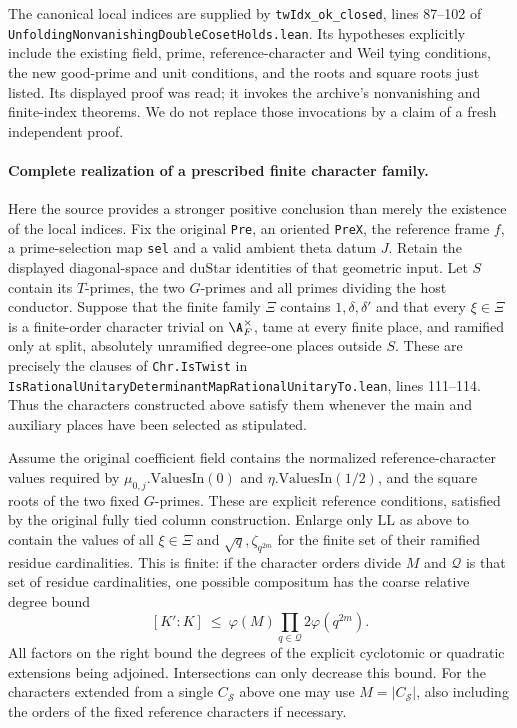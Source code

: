 \documentclass[11pt]{article}
\theoremstyle{definition}\newtheorem{definition}[theorem]{Definition}\newtheorem{remark}[theorem]{Remark}
\begin{document}
The canonical local indices are supplied by
\texttt{twIdx\_ok\_closed}, lines 87--102 of
\nolinkurl{UnfoldingNonvanishingDoubleCosetHolds.lean}.
Its hypotheses explicitly include the existing field,
prime, reference-character and Weil tying conditions,
the new good-prime and unit conditions, and the roots
and square roots just listed.  Its displayed proof was
read; it invokes the archive's nonvanishing and finite-index
theorems.  We do not replace those invocations by a claim
of a fresh independent proof.

\paragraph{Complete realization of a prescribed finite character family.}
Here the source provides a stronger positive conclusion
than merely the existence of the local indices.  Fix the
original \texttt{Pre}, an oriented \texttt{PreX}, the
reference frame $f$, a prime-selection map \texttt{sel}
and a valid ambient theta datum $J$.  Retain the displayed
diagonal-space and $\mathrm{duStar}$ identities of that
geometric input.  Let $S$ contain its $T$-primes,
the two $G$-primes and all primes dividing the host
conductor.  Suppose that the finite family $\Xi$ contains
$1,\delta,\delta'$ and that every $\xi\in\Xi$ is a
finite-order character trivial on $\A_F^\times$, tame
at every finite place, and ramified only at split,
absolutely unramified degree-one places outside $S$.
These are precisely the clauses of \texttt{Chr.IsTwist}
in
\nolinkurl{IsRationalUnitaryDeterminantMapRationalUnitaryTo.lean},
lines 111--114.  Thus the characters constructed above
satisfy them whenever the main and auxiliary places
have been selected as stipulated.

Assume the original coefficient field contains the
normalized reference-character values required by
$\mu_{0,j}.\mathrm{ValuesIn}(0)$ and
$\eta.\mathrm{ValuesIn}(1/2)$, and the square roots
of the two fixed $G$-primes.  These are explicit reference
conditions, satisfied by the original fully tied
column construction.  Enlarge only $\mathrm{LL}$ as
above to contain the values of all $\xi\in\Xi$ and
$\sqrt q,\zeta_{q^{2m}}$ for the finite set of their
ramified residue cardinalities.  This is finite: if
the character orders divide $M$ and $\mathcal Q$ is
that set of residue cardinalities, one possible
compositum has the coarse relative degree bound
\[
 [K':K]\ \leq\ \varphi(M)
                   \prod_{q\in\mathcal Q}2\varphi(q^{2m}).
 \tag{A13o}
\]
All factors on the right bound the degrees of the
explicit cyclotomic or quadratic extensions being
adjoined.  Intersections can only decrease this bound.
For the characters extended from a single
$C_{\mathcal S}$ above one may use $M=|C_{\mathcal S}|$,
also including the orders of the fixed reference
characters if necessary.
\end{document}
